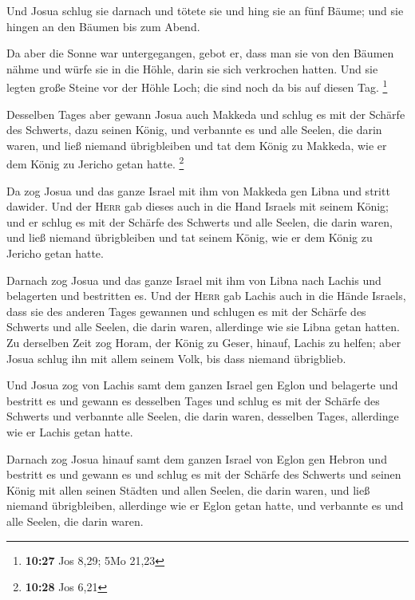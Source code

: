  Und Josua schlug sie darnach und tötete sie und hing sie
an fünf Bäume; und sie hingen an den Bäumen bis zum Abend.

 Da aber die Sonne war untergegangen, gebot er, dass man
sie von den Bäumen nähme und würfe sie in die Höhle, darin sie sich
verkrochen hatten. Und sie legten große Steine vor der Höhle Loch; die
sind noch da bis auf diesen Tag. \footnote{\textbf{10:27} Jos 8,29; 5Mo
  21,23}

 Desselben Tages aber gewann Josua auch Makkeda und
schlug es mit der Schärfe des Schwerts, dazu seinen König, und verbannte
es und alle Seelen, die darin waren, und ließ niemand übrigbleiben und
tat dem König zu Makkeda, wie er dem König zu Jericho getan hatte.
\footnote{\textbf{10:28} Jos 6,21}

 Da zog Josua und das ganze Israel mit ihm von Makkeda
gen Libna und stritt dawider.  Und der \textsc{Herr} gab
dieses auch in die Hand Israels mit seinem König; und er schlug es mit
der Schärfe des Schwerts und alle Seelen, die darin waren, und ließ
niemand übrigbleiben und tat seinem König, wie er dem König zu Jericho
getan hatte.

 Darnach zog Josua und das ganze Israel mit ihm von Libna
nach Lachis und belagerten und bestritten es.  Und der
\textsc{Herr} gab Lachis auch in die Hände Israels, dass sie des anderen
Tages gewannen und schlugen es mit der Schärfe des Schwerts und alle
Seelen, die darin waren, allerdinge wie sie Libna getan hatten.
 Zu derselben Zeit zog Horam, der König zu Geser, hinauf,
Lachis zu helfen; aber Josua schlug ihn mit allem seinem Volk, bis dass
niemand übrigblieb.

 Und Josua zog von Lachis samt dem ganzen Israel gen
Eglon und belagerte und bestritt es  und gewann es
desselben Tages und schlug es mit der Schärfe des Schwerts und verbannte
alle Seelen, die darin waren, desselben Tages, allerdinge wie er Lachis
getan hatte.

 Darnach zog Josua hinauf samt dem ganzen Israel von
Eglon gen Hebron und bestritt es  und gewann es und
schlug es mit der Schärfe des Schwerts und seinen König mit allen seinen
Städten und allen Seelen, die darin waren, und ließ niemand
übrigbleiben, allerdinge wie er Eglon getan hatte, und verbannte es und
alle Seelen, die darin waren.

